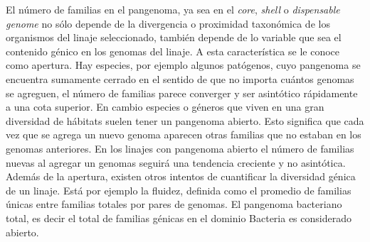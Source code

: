 \documentclass[12pt,twoside]{reedthesis}
\begin{document}
  El número de familias en el pangenoma, ya sea en el \emph{core},
  \emph{shell} o \emph{dispensable genome} no sólo depende de la
  divergencia o proximidad taxonómica de los organismos del linaje
  seleccionado, también depende de lo variable que sea el contenido génico
  en los genomas del linaje. A esta característica se le conoce como
  apertura. Hay especies, por ejemplo algunos patógenos, cuyo pangenoma se
  encuentra sumamente cerrado en el sentido de que no importa cuántos
  genomas se agreguen, el número de familias parece converger y ser
  asintótico rápidamente a una cota superior. En cambio especies o géneros
  que viven en una gran diversidad de hábitats suelen tener un pangenoma
  abierto. Esto significa que cada vez que se agrega un nuevo genoma
  aparecen otras familias que no estaban en los genomas anteriores. En los
  linajes con pangenoma abierto el número de familias nuevas al agregar un
  genomas seguirá una tendencia creciente y no asintótica. Además de la
  apertura, existen otros intentos de cuantificar la diversidad génica de
  un linaje. Está por ejemplo la fluidez, definida como el promedio de
  familias únicas entre familias totales por pares de genomas. El
  pangenoma bacteriano total, es decir el total de familias génicas en el
  dominio Bacteria es considerado abierto.
  
\end{document}
